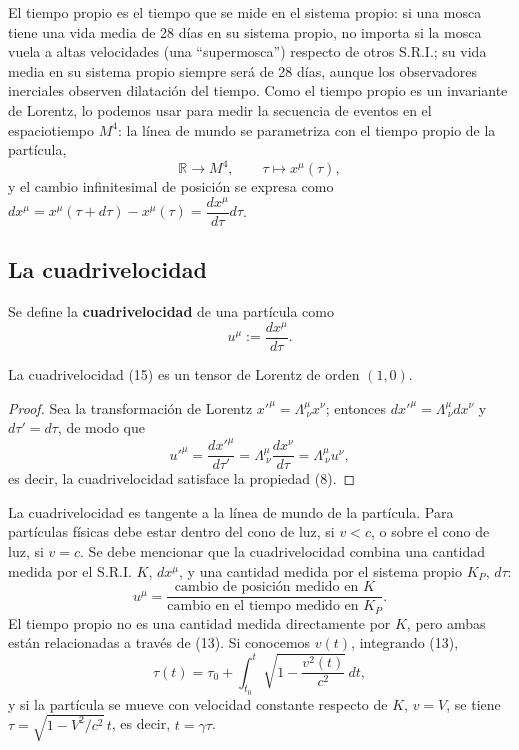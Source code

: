 El tiempo propio es el tiempo que se mide en el sistema propio: si una
mosca tiene una vida media de 28 días en su sistema propio, no importa
si la mosca vuela a altas velocidades (una ``supermosca'') respecto de
otros S.R.I.; su vida media en su sistema propio siempre será de 28
días, aunque los observadores inerciales observen dilatación del tiempo.
Como el tiempo propio es un invariante de Lorentz, lo podemos usar para
medir la secuencia de eventos en el espaciotiempo $M^4$: la línea de
mundo se parametriza con el tiempo propio de la partícula,
\[
\mathbb{R}\to M^4, \qquad \tau\mapsto x^\mu(\tau),
\]
y el cambio infinitesimal de posición se expresa como
$dx^\mu=x^\mu(\tau+d\tau)-x^\mu(\tau)=\dfrac{dx^\mu}{d\tau}d\tau$.

\subsection{La cuadrivelocidad}

\begin{definicion}[Cuadrivelocidad]
Se define la \textbf{cuadrivelocidad} de una partícula como
\[
u^\mu := \frac{dx^\mu}{d\tau} . \tag{15}
\]
\end{definicion}

\begin{proposicionc}
La cuadrivelocidad (15) es un tensor de Lorentz de orden $(1,0)$.
\end{proposicionc}

\begin{proof}
Sea la transformación de Lorentz $x'^\mu=\Lambda^\mu_{\ \nu}x^\nu$;
entonces $dx'^\mu=\Lambda^\mu_{\ \nu}dx^\nu$ y $d\tau'=d\tau$, de modo
que
\[
u'^\mu = \frac{dx'^\mu}{d\tau'} = \Lambda^\mu_{\ \nu}\frac{dx^\nu}{d\tau}
= \Lambda^\mu_{\ \nu}u^\nu,
\]
es decir, la cuadrivelocidad satisface la propiedad (8). \qedhere
\end{proof}

La cuadrivelocidad es tangente a la línea de mundo de la partícula. Para
partículas físicas debe estar dentro del cono de luz, si $v<c$, o sobre
el cono de luz, si $v=c$. Se debe mencionar que la cuadrivelocidad
combina una cantidad medida por el S.R.I. $K$, $dx^\mu$, y una cantidad
medida por el sistema propio $K_P$, $d\tau$:
\[
u^\mu = \frac{\text{cambio de posición medido en } K}{\text{cambio en el
tiempo medido en } K_P}.
\]
El tiempo propio no es una cantidad medida directamente por $K$, pero
ambas están relacionadas a través de (13). Si conocemos $v(t)$,
integrando (13),
\[
\tau(t) = \tau_0+\int_{t_0}^t\sqrt{1-\frac{v^2(t)}{c^2}}\,dt,
\]
y si la partícula se mueve con velocidad constante respecto de $K$,
$v=V$, se tiene $\tau=\sqrt{1-V^2/c^2}\,t$, es decir, $t=\gamma\tau$.

